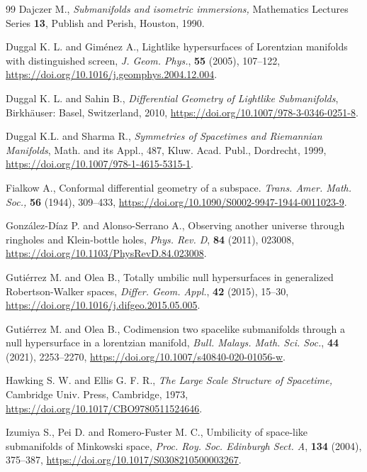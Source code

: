 \documentclass[11pt]{article}
\numberwithin{equation}{section}
\begin{document}
\begin{thebibliography}{99}
		Dajczer M., {\it Submanifolds and isometric immersions,}  Mathematics Lectures Series \textbf{13}, Publish and Perish, Houston, 1990.
		
		Duggal K. L.  and Giménez A., Lightlike hypersurfaces of Lorentzian manifolds with distinguished screen, \emph{J. Geom. Phys.}, \textbf{55} (2005), 107--122, \url{https://doi.org/10.1016/j.geomphys.2004.12.004}.
		
		Duggal K. L. and Sahin B., \emph{Differential Geometry of Lightlike Submanifolds}, Birkhäuser: Basel, Switzerland, 2010, \url{https://doi.org/10.1007/978-3-0346-0251-8}.
		
		Duggal K.L. and Sharma R., \emph{Symmetries of Spacetimes and Riemannian Manifolds}, Math. and its Appl., 487, Kluw. Acad. Publ., Dordrecht, 1999, \url{https://doi.org/10.1007/978-1-4615-5315-1}.
		
		Fialkow A., Conformal differential geometry of a subspace. \emph{Trans. Amer. Math. Soc.,} \textbf{56} (1944), 309--433, \url{https://doi.org/10.1090/S0002-9947-1944-0011023-9}.
		
		González-Díaz P. and Alonso-Serrano A., Observing another universe through ringholes and Klein-bottle holes, \emph{Phys. Rev. D}, \textbf{84} (2011), 023008, \url{https://doi.org/10.1103/PhysRevD.84.023008}.
		
	
		Gutiérrez M. and Olea B., Totally umbilic null hypersurfaces in generalized Robertson-Walker spaces, \emph{Differ. Geom. Appl.}, \textbf{42} (2015), 15--30, \url{https://doi.org/10.1016/j.difgeo.2015.05.005}.
		
		Gutiérrez M. and Olea B., Codimension two spacelike submanifolds through a null hypersurface in a lorentzian manifold, \emph{Bull. Malays. Math. Sci. Soc.}, \textbf{44} (2021), 2253--2270, \url{https://doi.org/10.1007/s40840-020-01056-w}.
		
		Hawking S. W. and Ellis G. F. R., {\it The Large Scale Structure of Spacetime,} Cambridge Univ. Press, Cambridge, 1973, \url{https://doi.org/10.1017/CBO9780511524646}.
		
		Izumiya S., Pei D. and Romero-Fuster M. C., Umbilicity of space-like submanifolds of Minkowski space, \emph{Proc. Roy. Soc. Edinburgh Sect. A}, \textbf{134} (2004), 375--387, \url{https://doi.org/10.1017/S0308210500003267}.
		

\end{thebibliography}
\end{document}
